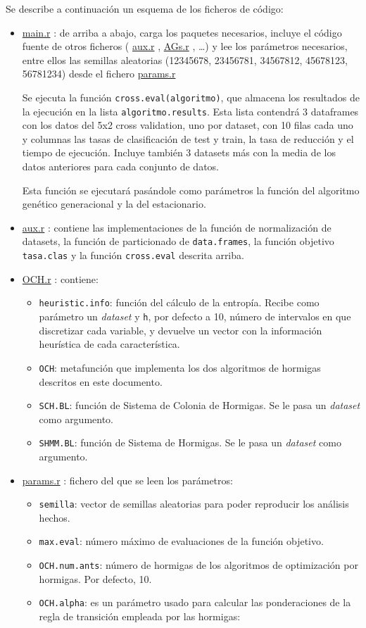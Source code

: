 \documentclass[a4paper,11pt]{article}
\newcommand{\hrefr}[1]{
\href{../bin/#1}{#1}
}
\begin{document}
Se describe a continuación un esquema de los ficheros de código:
\begin{itemize}
 \item \hrefr{main.r}: de arriba a abajo, carga los paquetes necesarios, incluye el código fuente de otros ficheros
  (\hrefr{aux.r}, \hrefr{AGs.r}, \ldots) y lee los parámetros necesarios, entre ellos las 
  semillas aleatorias (12345678, 23456781, 34567812, 45678123, 56781234) desde el fichero \hrefr{params.r}
  
  Se ejecuta la función \texttt{cross.eval(algoritmo)}, que almacena los resultados de la ejecución en la lista
  \texttt{algoritmo.results}. Esta lista contendrá 3 dataframes con los datos del 5x2 cross validation, uno por dataset, 
  con 10 filas cada uno  y columnas las tasas de clasificación de test y train, la tasa de reducción y el tiempo de 
  ejecución. Incluye también 3 datasets más con la media de los datos anteriores para cada conjunto de datos.
 
  Esta función se ejecutará pasándole como parámetros la función del algoritmo genético generacional y la del estacionario.
  
 \item \hrefr{aux.r}: contiene las implementaciones de la función de normalización de datasets, la función de
 particionado de \texttt{data.frames}, la función objetivo \texttt{tasa.clas} y la función \texttt{cross.eval}
 descrita arriba.
 
 \item \hrefr{OCH.r}: contiene:
  \begin{itemize}
   \item \texttt{heuristic.info}: función del cálculo de la entropía. Recibe como parámetro un \textit{dataset}
    y \texttt{h}, por defecto a 10, número de intervalos en que discretizar cada variable, y devuelve un 
    vector con la información heurística de cada característica.
    \item \texttt{OCH}: metafunción que implementa los dos algoritmos de hormigas descritos en este documento.
    \item \texttt{SCH.BL}: función de Sistema de Colonia de Hormigas. Se le pasa un \textit{dataset} como argumento.
    \item \texttt{SHMM.BL}: función de Sistema de Hormigas. Se le pasa un \textit{dataset} como argumento.
  \end{itemize}
 
 \item \hrefr{params.r}: fichero del que se leen los parámetros:
  \begin{itemize}
    \item \texttt{semilla}: vector de semillas aleatorias para poder reproducir los análisis hechos.
    \item \texttt{max.eval}: número máximo de evaluaciones de la función objetivo.
    \item \texttt{OCH.num.ants}: número de hormigas de los algoritmos de optimización por hormigas. Por defecto, 10.
    \item \texttt{OCH.alpha}: es un parámetro usado para calcular las ponderaciones de la regla de transición empleada
      por las hormigas:
    

\end{itemize}
\end{itemize}
\end{document}
